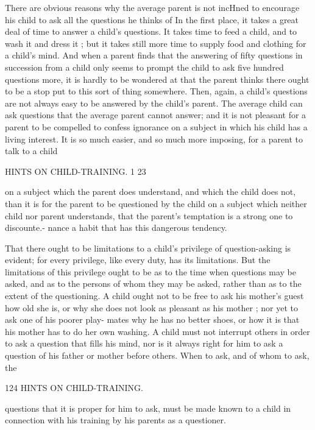 \documentclass[
]{book}
\begin{document}
There are obvious reasons why the average parent is not incHned to encourage his child to ask all the questions he thinks of In the first place, it takes a great deal of time to answer a child's questions. It takes time to feed a child, and to wash it and dress it ; but it takes still more time to supply food and clothing for a child's mind. And when a parent finds that the answering of fifty questions in succession from a child only seems to prompt the child to ask five hundred questions more, it is hardly to be wondered at that the parent thinks there ought to be a stop put to this sort of thing somewhere. Then, again, a child's questions are not always easy to be answered by the child's parent. The average child can ask questions that the average parent cannot answer; and it is not pleasant for a parent to be compelled to confess ignorance on a subject in which his child has a living interest. It is so much easier, and so much more imposing, for a parent to talk to a child

HINTS ON CHILD-TRAINING. 1 23

on a subject which the parent does understand, and which the child does not, than it is for the parent to be questioned by the child on a subject which neither child nor parent understands, that the parent's temptation is a strong one to discounte.- nance a habit that has this dangerous tendency.

That there ought to be limitations to a child's privilege of question-asking is evident; for every privilege, like every duty, has its limitations. But the limitations of this privilege ought to be as to the time when questions may be asked, and as to the persons of whom they may be asked, rather than as to the extent of the questioning. A child ought not to be free to ask his mother's guest how old she is, or why she does not look as pleasant as his mother ; nor yet to ask one of his poorer play- mates why he has no better shoes, or how it is that his mother has to do her own washing. A child must not interrupt others in order to ask a question that fills his mind, nor is it always right for him to ask a question of his father or mother before others. When to ask, and of whom to ask, the

124 HINTS ON CHILD-TRAINING.

questions that it is proper for him to ask, must be made known to a child in connection with his training by his parents as a questioner.
\end{document}
